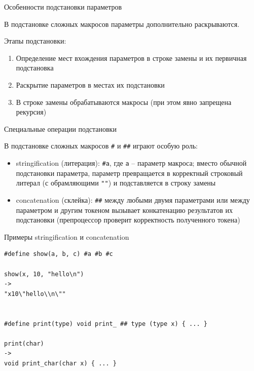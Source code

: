 \documentclass[unknownkeysallowed,xcolor=table]{beamer}
\begin{document}
\begin{frame}{Особенности подстановки параметров}

В подстановке сложных макросов параметры дополнительно раскрываются.

\vspace{1em}

Этапы подстановки:
\vspace{0.5em}
\begin{enumerate}
  \item Определение мест вхождения параметров в строке замены и их первичная подстановка \vspace{0.7em}
  \item Раскрытие параметров в местах их подстановки \vspace{0.7em}
  \item В строке замены обрабатываются макросы (при этом явно запрещена рекурсия)
\end{enumerate}

\end{frame}

\begin{frame}[fragile]{Специальные операции подстановки}

В подстановке сложных макросов \lstinline{#} и \lstinline{##} играют особую роль:

\vspace{2em}

\begin{itemize}
  \item stringification (литерация): \lstinline{#a}, где \lstinline{a} -- параметр макроса; вместо обычной подстановки параметра, параметр превращается в корректный строковый литерал (с обрамляющими \lstinline{""}) и подставляется в строку замены \vspace{1em}
  \item concatenation (склейка): \lstinline{##} между любыми двумя параметрами или между параметром и другим токеном вызывает конкатенацию результатов их подстановки (препроцессор проверит корректность полученного токена)
\end{itemize}

\end{frame}

\begin{frame}[fragile]{Примеры stringification и concatenation}

\begin{lstlisting}
#define show(a, b, c) #a #b #c

show(x, 10, "hello\n")
->
"x10\"hello\\n\""


#define print(type) void print_ ## type (type x) { ... }

print(char)
->
void print_char(char x) { ... }
\end{lstlisting}

\end{frame}
\end{document}
